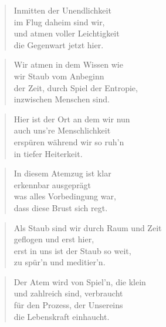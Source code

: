 \documentclass[10pt,a4paper]{article}
\begin{document}
\begin{multicols}{2}


\begin{verse}
Inmitten der Unendlichkeit \\
im Flug daheim sind wir, \\
und atmen voller Leichtigkeit \\
die Gegenwart jetzt hier. \\
\end{verse}

\begin{verse}
Wir atmen in dem Wissen wie \\
wir Staub vom Anbeginn \\
der Zeit, durch Spiel der Entropie, \\
inzwischen Menschen sind. \\
\end{verse}

\begin{verse}
Hier ist der Ort an dem wir nun \\
auch uns’re Menschlichkeit \\
erspüren während wir so ruh’n \\
in tiefer Heiterkeit. \\
\end{verse}

\begin{verse}
In diesem Atemzug ist klar \\
erkennbar ausgeprägt \\
was alles Vorbedingung war, \\
dass diese Brust sich regt. \\
\end{verse}

\begin{verse}
Als Staub sind wir durch Raum und Zeit \\
geflogen und erst hier, \\
erst in uns ist der Staub so weit, \\
zu spür’n und meditier’n. \\
\end{verse}

\begin{verse}
Der Atem wird von Spiel’n, die klein \\
und zahlreich sind, verbraucht \\
für den Prozess, der Unsereins \\
die Lebenskraft einhaucht. \\
\end{verse}


\end{multicols}
\end{document}
